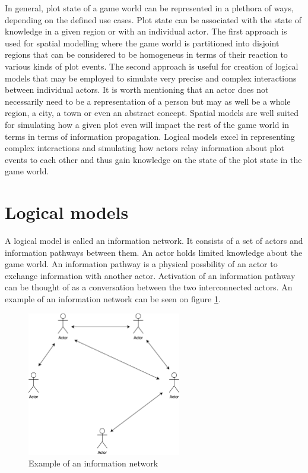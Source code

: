 In general, plot state of a game world can be represented in a plethora of ways, depending on the defined use cases.
Plot state can be associated with the state of knowledge in a given region or with an individual actor.
The first approach is used for spatial modelling where the game world is partitioned into disjoint regions that can be considered to be homogeneus in terms of their reaction to various kinds of plot events.
The second approach is useful for creation of logical models that may be employed to simulate very precise and complex interactions between individual actors.
It is worth mentioning that an actor does not necessarily need to be a representation of a person but may as well be a whole region, a city, a town or even an abstract concept.
Spatial models are well suited for simulating how a given plot even will impact the rest of the game world in terms in terms of information propagation.
Logical models excel in representing complex interactions and simulating how actors relay information about plot events to each other and thus gain knowledge on the state of the plot state in the game world.

\section{Logical models}

A logical model is called an information network.
It consists of a set of actors and information pathways between them.
An actor holds limited knowledge about the game world.
An information pathway is a physical possbility of an actor to exchange information with another actor.
Activation of an information pathway can be thought of as a conversation between the two interconnected actors.
An example of an information network can be seen on figure \ref{fig:logical_model_example}.

\begin{figure}
    \centering
    \includegraphics[width=0.6\textwidth]{images/logical_model_example.png}
    \caption{Example of an information network}\label{fig:logical_model_example}
\end{figure}

